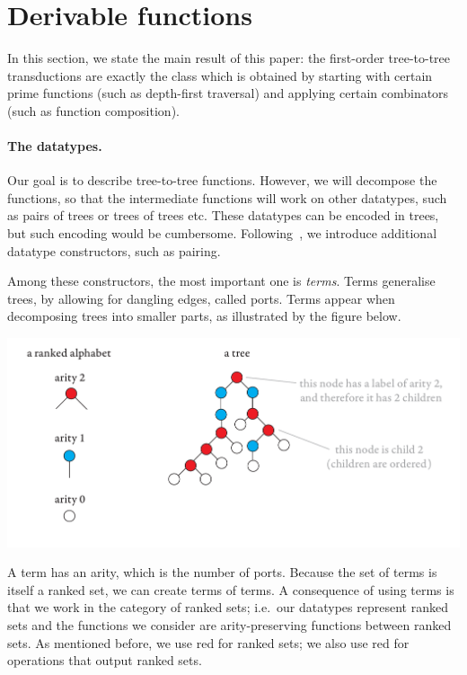 \section{Derivable functions}
In this section, we state the main result of this paper: the  first-order tree-to-tree transductions are exactly the class which is obtained by starting with certain prime functions (such as depth-first traversal) and applying certain  combinators (such as function composition). 

\paragraph*{The datatypes.}  Our goal is to describe tree-to-tree functions. However, we will decompose the functions, so that the   intermediate functions will work on other datatypes, such as pairs of trees or trees of trees etc. These datatypes  can be encoded in trees, but such encoding would be cumbersome. Following~\cite{bojanczykRegularFirstOrderList2018}, we  introduce additional  datatype constructors, such as pairing.

Among these constructors, the most important one is \emph{terms}. Terms generalise trees, by allowing for dangling edges, called ports. Terms appear when  decomposing trees into smaller parts, as illustrated by the figure below. 
\begin{center}
\includegraphics[scale=.32, page=15]{pics.pdf}
\end{center}
A term has an arity, which is  the number of ports. Because the set of terms is itself a ranked set,  we can create terms of terms.  A consequence of using terms is that we  work in the category of ranked sets; i.e.~our datatypes represent ranked sets and the functions we consider are arity-preserving functions between ranked sets.  As mentioned before, we use  red for ranked sets; we also use red  for operations that output ranked sets. 

